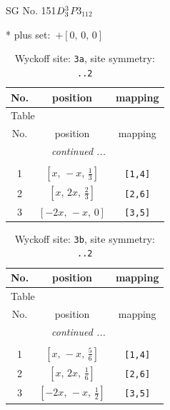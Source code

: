 \documentclass[fleqn,8pt]{jsarticle}
\begin{document}
\setcounter{MaxMatrixCols}{32}

\renewcommand{\tablename}{Table~}
\renewcommand{\figurename}{Figure~}
\begin{center}
\LARGE
SG No. 151\quad$D_{\rm 3}^{3}$\quad$P3_112$\quad[ trigonal ]
\end{center}
* plus set:\,\,\,$+\left[ 0,\, 0,\, 0 \right]$
\renewcommand{\arraystretch}{1.2}
\begin{longtable}{ccc}
\caption{Wyckoff site: {\tt 3a}, site symmetry: {\tt ..2}}
 \\
 \hline \hline
No. & position & mapping \\ \hline \endfirsthead

\multicolumn{2}{l}{\tablename\ \thetable{}} \\
 \hline \hline
No. & position & mapping \\ \hline \endhead

 \hline \hline
\multicolumn{2}{r}{\footnotesize\it continued ...} \\ \endfoot

 \hline \hline
\multicolumn{2}{r}{} \\ \endlastfoot

1 & $\left[ x,\, - x,\, \frac{1}{3} \right]$ & {\tt [1,4]} \\ \hline
2 & $\left[ x,\, 2 x,\, \frac{2}{3} \right]$ & {\tt [2,6]} \\ \hline
3 & $\left[ - 2 x,\, - x,\, 0 \right]$ & {\tt [3,5]} \\
\end{longtable}
\renewcommand{\arraystretch}{1.2}
\begin{longtable}{ccc}
\caption{Wyckoff site: {\tt 3b}, site symmetry: {\tt ..2}}
 \\
 \hline \hline
No. & position & mapping \\ \hline \endfirsthead

\multicolumn{2}{l}{\tablename\ \thetable{}} \\
 \hline \hline
No. & position & mapping \\ \hline \endhead

 \hline \hline
\multicolumn{2}{r}{\footnotesize\it continued ...} \\ \endfoot

 \hline \hline
\multicolumn{2}{r}{} \\ \endlastfoot

1 & $\left[ x,\, - x,\, \frac{5}{6} \right]$ & {\tt [1,4]} \\ \hline
2 & $\left[ x,\, 2 x,\, \frac{1}{6} \right]$ & {\tt [2,6]} \\ \hline
3 & $\left[ - 2 x,\, - x,\, \frac{1}{2} \right]$ & {\tt [3,5]} \\
\end{longtable}
\end{document}
